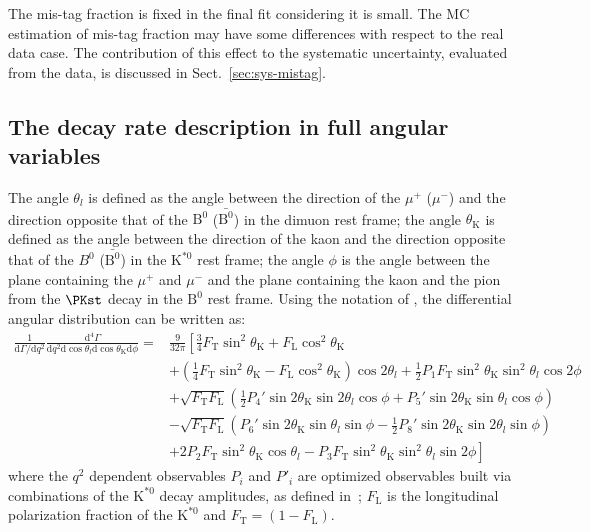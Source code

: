 The mis-tag fraction is fixed in the final fit considering it is small.
The MC estimation of mis-tag fraction may have some differences with respect to the real data case.
The contribution of this effect to the systematic uncertainty, evaluated from the data, is discussed in Sect.~\ref{sec:sys-mistag}.





\subsection{The decay rate description in full angular variables}
\label{sec:fullform}

The angle $\theta_l$ is defined as the angle between the
direction of the $\mu^+ $ ($\mu^- $) and the direction opposite that of
the $\text{B}^0$ ($\bar{\text{B}^0}$) in the dimuon rest frame; the
angle $\theta_\mathrm{K} $ is defined as the angle between the direction of the
kaon and the direction opposite that of the $B^0$
($\bar{\text{B}^0}$) in the $\text{K}^{*0}$ rest frame; the angle
$\phi$ is the angle between the plane containing the $\mu^+ $ and
$\mu^- $ and the plane containing the kaon and the pion from the
$\PKst$ decay in the $\text{B}^0$ rest frame.  Using the notation of
\cite{Ball2009}, the differential angular distribution can be written
as:
\begin{equation} \label{eq:Angular}
    \begin{split}
        \frac{1}{\mathrm{d}\Gamma/\mathrm{d}q^2}\frac{\mathrm{d}^4\Gamma}{\mathrm{d}q^2 \mathrm{d}\cos\theta_l \mathrm{d}\cos\theta_\mathrm{K} \mathrm{d}\phi} =&\frac{9}{32\pi}\left[\frac{3}{4}F_\mathrm{T}\sin^2\theta_\mathrm{K} + F_\mathrm{L}\cos^2\theta_\mathrm{K} \right.\\
            &\left.+\left(\frac{1}{4}F_\mathrm{T}\sin^2\theta_\mathrm{K}-F_\mathrm{L}\cos^2\theta_\mathrm{K}\right)\cos2\theta_l+\frac{1}{2}P_1F_\mathrm{T}\sin^2\theta_\mathrm{K}\sin^2\theta_l\cos 2\phi \right.\\
            &+\sqrt{F_\mathrm{T}F_\mathrm{L}}\left(\frac{1}{2}P_4'\sin2\theta_\mathrm{K}\sin2\theta_l\cos\phi+P_5'\sin2\theta_\mathrm{K}\sin\theta_l\cos\phi \right)\\
            &-\sqrt{F_\mathrm{T}F_\mathrm{L}}\left(P_6'\sin2\theta_\mathrm{K}\sin\theta_l\sin\phi-\frac{1}{2}P_8'\sin2\theta_\mathrm{K}\sin2\theta_l\sin\phi \right)\\
            &\left.+2P_2F_\mathrm{T}\sin^2\theta_\mathrm{K}\cos\theta_l-P_3F_\mathrm{T}\sin^2\theta_\mathrm{K}\sin^2\theta_l\sin2\phi \right]
    \end{split}
\end{equation}
where the $q^2$ dependent observables $P_i$ and $P'_i$ are optimized observables built via 
combinations of the $\text{K}^{*0}$ decay amplitudes, as defined in~\cite{Genon:Swave};
$F_\mathrm{L}$ is the longitudinal polarization fraction of the $\text{K}^{*0}$ and
$F_\mathrm{T}=(1-F_\mathrm{L})$.

